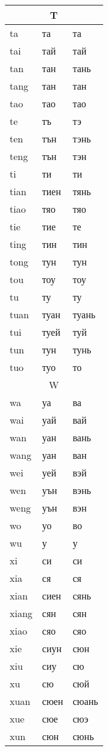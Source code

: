 \begin{longtable}{|l|l|l|}
\hline

\multicolumn{3}{|c|}{T} \\ \hline

ta &та &та
\\tai &тай &тай
\\tan &тан &тань
\\tang &тан &тан
\\tao &тао &тао
\\te &тъ &тэ
\\ten &тън &тэнь
\\teng &тън &тэн
\\ti &ти &ти
\\tian &тиен &тянь
\\tiao &тяо &тяо
\\tie &тие &те
\\ting &тин &тин
\\tong &тун &тун
\\tou &тоу &тоу
\\tu &ту &ту
\\tuan &туан &туань
\\tui &туей &туй
\\tun &тун &тунь
\\tuo &туо &то
\\

\hline

\multicolumn{3}{|c|}{W} \\ \hline

wa &уа &ва
\\wai &уай &вай
\\wan &уан &вань
\\wang &уан &ван
\\wei &уей &вэй
\\wen &уън &вэнь
\\weng &уън &вэн
\\wo &уо &во
\\wu &у &у
\\

\hline

xi &си &си
\\xia &ся &ся
\\xian &сиен &сянь
\\xiang &сян &сян
\\xiao &сяо &сяо
\\xie &сиун &сюн
\\xiu &сиу &сю
\\xu &сю &сюй
\\xuan &сюен &сюань
\\xue &сюе &сюэ
\\xun &сюн &сюнь
\\


\end{longtable}
